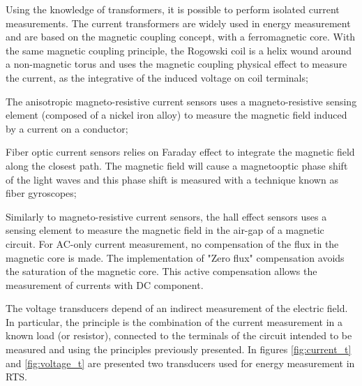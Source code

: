 	\begin{description}
		\setlength\itemsep{-0em}
		\item [Magnetic coupling] Using the knowledge of transformers, it is possible to perform isolated current measurements. The current transformers are widely used in energy measurement and are based on the magnetic coupling concept, with a ferromagnetic core. With the same magnetic coupling principle, the Rogowski coil is a helix wound around a non-magnetic torus and uses the magnetic coupling physical effect to measure the current, as the integrative of the induced voltage on coil terminals;
		\item [Magneto resistance] The anisotropic magneto-resistive current sensors uses a magneto-resistive sensing element (composed of a nickel iron alloy) to measure the magnetic field induced by a current on a conductor;
		\item [Faraday induction] Fiber optic current sensors relies on Faraday effect to integrate the magnetic field along the closest path. The magnetic field will cause a magnetooptic phase shift of the light waves and this phase shift is measured with a technique known as fiber gyroscopes;
		\item [Hall Effect] Similarly to magneto-resistive current sensors, the hall effect sensors uses a sensing element to measure the magnetic field in the air-gap of a magnetic circuit. For AC-only current measurement, no compensation of the flux in the magnetic core is made. The implementation of "Zero flux" compensation avoids the saturation of the magnetic core. This active compensation allows the measurement of currents with DC component.
		
	\end{description}

	The voltage transducers depend of an indirect measurement of the electric field. In particular, the principle is the combination of the current measurement in a known load (or resistor), connected to the terminals of the circuit intended to be measured and using the principles previously presented. In figures \ref{fig:current_t} and \ref{fig:voltage_t} are presented two transducers used for energy measurement in RTS.
	
